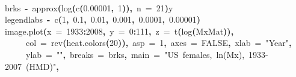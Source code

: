 \documentclass[a4paper]{article}
\newcommand{\hlnumber}[1]{\textcolor[rgb]{0.0823529411764706,0.0784313725490196,0.709803921568627}{#1}}%
\newcommand{\hlfunctioncall}[1]{\textcolor[rgb]{1,0,0}{#1}}%
\newcommand{\hlstring}[1]{\textcolor[rgb]{0.6,0.6,1}{#1}}%
\newcommand{\hlkeyword}[1]{\textcolor[rgb]{0,0,0}{\textbf{#1}}}%
\newcommand{\hlargument}[1]{\textcolor[rgb]{0.694117647058824,0.247058823529412,0.0196078431372549}{#1}}%
\newcommand{\hlassignement}[1]{\textcolor[rgb]{0.215686274509804,0.215686274509804,0.384313725490196}{\textbf{#1}}}%
\newcommand{\hlsymbol}[1]{\textcolor[rgb]{0,0,0}{#1}}%
\newcommand{\hlprompt}[1]{\textcolor[rgb]{0,0,0}{#1}}%
\newcommand{\hlstd}[1]{\textcolor[rgb]{0,0,0}{#1}}%
\newenvironment{Houtput}{\raggedright}{%
%
}
\begin{document}
\begin{Houtput}
\hspace*{\fill}\\
\hlstd{}\ttfamily\noindent
\hlprompt{\usebox{\hlnormalsizeboxgreaterthan}{\ }}\hlsymbol{brks}{\ }\hlassignement{\usebox{\hlnormalsizeboxlessthan}-}{\ }\hlfunctioncall{approx}\hlkeyword{(}\hlfunctioncall{log}\hlkeyword{(}\hlfunctioncall{c}\hlkeyword{(}\hlnumber{0.00001}\hlkeyword{,}{\ }\hlnumber{1}\hlkeyword{)}\hlkeyword{)}\hlkeyword{,}{\ }\hlargument{n}{\ }\hlargument{=}{\ }\hlnumber{21}\hlkeyword{)}\hlkeyword{\usebox{\hlnormalsizeboxdollar}}\hlsymbol{y}\mbox{}
\normalfont
\hspace*{\fill}\\
\hlstd{}\ttfamily\noindent
\hlprompt{\usebox{\hlnormalsizeboxgreaterthan}{\ }}\hlsymbol{legendlabs}{\ }\hlassignement{\usebox{\hlnormalsizeboxlessthan}-}{\ }\hlfunctioncall{c}\hlkeyword{(}\hlnumber{1}\hlkeyword{,}{\ }\hlnumber{0.1}\hlkeyword{,}{\ }\hlnumber{0.01}\hlkeyword{,}{\ }\hlnumber{0.001}\hlkeyword{,}{\ }\hlnumber{0.0001}\hlkeyword{,}{\ }\hlnumber{0.00001}\hlkeyword{)}\mbox{}
\normalfont
\hspace*{\fill}\\
\hlstd{}\ttfamily\noindent
\hlprompt{\usebox{\hlnormalsizeboxgreaterthan}{\ }}\hlfunctioncall{image.plot}\hlkeyword{(}\hlargument{x}{\ }\hlargument{=}{\ }\hlnumber{1933}\hlkeyword{:}\hlnumber{2008}\hlkeyword{,}{\ }\hlargument{y}{\ }\hlargument{=}{\ }\hlnumber{0}\hlkeyword{:}\hlnumber{111}\hlkeyword{,}{\ }\hlargument{z}{\ }\hlargument{=}{\ }\hlfunctioncall{t}\hlkeyword{(}\hlfunctioncall{log}\hlkeyword{(}\hlsymbol{MxMat}\hlkeyword{)}\hlkeyword{)}\hlkeyword{,}\hspace*{\fill}\\
\hlstd{}\hlprompt{{\ }}{\ }{\ }{\ }{\ }\hlargument{col}{\ }\hlargument{=}{\ }\hlfunctioncall{rev}\hlkeyword{(}\hlfunctioncall{heat.colors}\hlkeyword{(}\hlnumber{20}\hlkeyword{)}\hlkeyword{)}\hlkeyword{,}{\ }\hlargument{asp}{\ }\hlargument{=}{\ }\hlnumber{1}\hlkeyword{,}{\ }\hlargument{axes}{\ }\hlargument{=}{\ }\hlnumber{FALSE}\hlkeyword{,}{\ }\hlargument{xlab}{\ }\hlargument{=}{\ }\hlstring{"Year"}\hlkeyword{,}\hspace*{\fill}\\
\hlstd{}\hlprompt{{\ }}{\ }{\ }{\ }{\ }\hlargument{ylab}{\ }\hlargument{=}{\ }\hlstring{""}\hlkeyword{,}{\ }\hlargument{breaks}{\ }\hlargument{=}{\ }\hlsymbol{brks}\hlkeyword{,}{\ }\hlargument{main}{\ }\hlargument{=}{\ }\hlstring{"US{\ }females,{\ }ln(Mx),{\ }1933-2007{\ }(HMD)"}\hlkeyword{,}\hspace*{\fill}\\

\end{Houtput}
\end{document}

